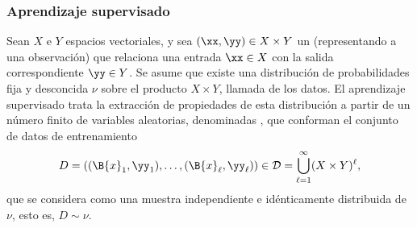 %
\subsubsection{Aprendizaje supervisado}
%
Sean $X$ e $Y$ espacios vectoriales, y sea $(\xx,\yy)\in{}X\times{}Y$
un  (representando a una observación) que relaciona una
entrada $\xx\in{}X$ con la salida correspondiente $\yy\in{}Y$.
%
Se asume que existe una distribución de probabilidades fija y
desconcida $\nu$ sobre el producto $X\times Y$, llamada
 de los datos.
El aprendizaje supervisado
trata la extracción de propiedades de esta distribución a partir de un
número finito de variables aleatorias, denominadas , que
conforman el conjunto de datos de entrenamiento
%
\begin{align}
  D = \left((\B{x}_1,\yy_1),\ldots,(\B{x}_\ell,\yy_\ell)\right) \in
  \mathcal{D}=\bigcup_{\ell=1}^\infty (X\times Y)^\ell,
\end{align}
%
que se considera como una muestra independiente e idénticamente
distribuida de $\nu$, esto es, $D\sim\nu$.

